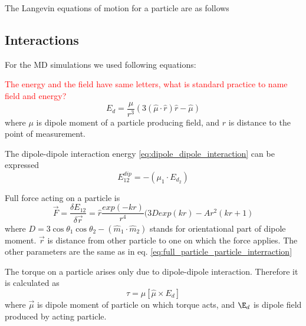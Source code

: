 \documentclass[12pt,a4paper]{article}
\begin{document}
The Langevin equations of motion for a particle are as follows

\subsection{Interactions}

For the MD simulations we used following equations:

\textcolor{red}{The energy and the field have same letters, what is standard practice to name field and energy?}
\label{eq:dipole_field}
\begin{equation}
E_d = \frac{\mu}{r^3} \left(3 (\hat{\mu} \cdot \hat{r}) \hat{r} - \hat{\mu} \right)
\end{equation}
where $\mu$ is dipole moment of a particle producing field, and $r$ is distance to the point of measurement.

The dipole-dipole interaction energy \ref{eq:dipole_dipole_interaction} can be expressed
\label{eq:dipole_energy_from_potential}
\begin{equation}
E^{dip}_{12} = -(\mu_1 \cdot E_{d_2})
\end{equation}

Full force acting on a particle is
\label{eq:full_force}
\begin{equation}
\vec{F} = \frac{\delta E_{12}}{\delta \vec{r}} = \hat{r} \frac{exp(-k r)}{r^4}(3 D exp(k r) - A r^2 (k r +1)
\end{equation}
where $D = 3 \cos \theta_1 \cos \theta_2 - (\hat{m}_1 \cdot \hat{m}_2)$ stands for orientational part of dipole moment. $\vec{r}$ is distance from other particle to one on which the force applies. The other parameters are the same as in eq. \ref{eq:full_particle_particle_interraction}

The torque on a particle arises only due to dipole-dipole interaction. Therefore it is calculated as
\label{eq:dipole_torque}
\begin{equation}
\tau  = \mu[\hat{\mu} \times E_d ]
\end{equation}
where $\vec{\mu}$ is dipole moment of particle on which torque acts, and $\E_d$ is dipole field produced by acting particle.



\cite{Camp2000}



\end{document}
